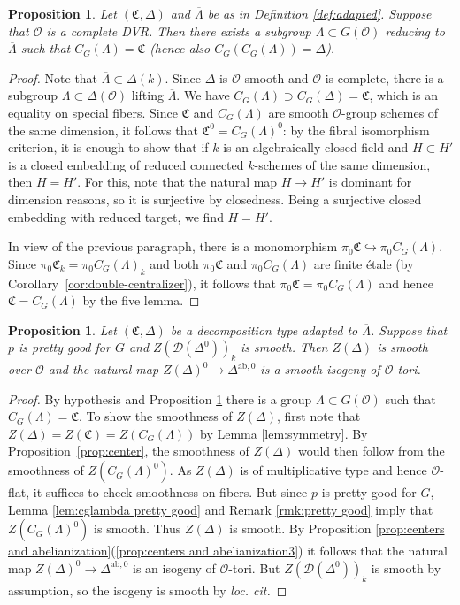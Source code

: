 \documentclass[11pt, letterpaper,english]{amsart}
\theoremstyle{plain}
\newtheorem{prop}[lem]{Proposition}
\theoremstyle{definition}
\numberwithin{equation}{section}
\numberwithin{lem}{section}
\newcommand{\fC}{\mathfrak{C}}
\newcommand{\cO}{\mathcal{O}}
\newcommand{\sD}{{\mathscr D}}
\newcommand{\into}{\hookrightarrow}
\newcommand{\ab}{\textrm{ab}}
\newcommand{\cent}[2]{C_{#1}(#2)}
\newcommand{\Ld}{\Lambda}
\newcommand{\Lbar}{\overline{\Lambda}}
\newcommand{\Dt}{\Delta}
\begin{document}
\begin{prop} \label{prop:adapted complete dvr}
Let $(\fC,\Dt)$ and $\Lbar$ be as in Definition \ref{def:adapted}. Suppose that $\cO$ is a complete DVR. Then there exists a subgroup $\Ld \subset G(\cO)$ reducing to $\overline{\Ld}$ such that
$\cent{G}{\Ld}=\fC$ (hence also $\cent{G}{\cent{G}{\Ld}}=\Dt$). 
\end{prop}

\begin{proof}
Note that $\Lbar \subset \Dt(k)$. Since $\Dt$ is $\cO$-smooth and $\cO$ is complete, there is a subgroup $\Ld \subset \Dt(\cO)$ lifting $\Lbar$. We have $\cent{G}{\Ld} \supset \cent{G}{\Dt} = \fC$, which is an equality on special fibers. Since $\fC$ and $C_G(\Lambda)$ are smooth $\cO$-group schemes of the same dimension, it follows that $\fC^0 = C_G(\Lambda)^0$: by the fibral isomorphism criterion, it is enough to show that if $k$ is an algebraically closed field and $H \subset H'$ is a closed embedding of reduced connected $k$-schemes of the same dimension, then $H = H'$. For this, note that the natural map $H \to H'$ is dominant for dimension reasons, so it is surjective by closedness. Being a surjective closed embedding with reduced target, we find $H = H'$.  

In view of the previous paragraph, there is a monomorphism $\pi_0 \fC \into \pi_0 \cent{G}{\Ld}$. Since $\pi_0 \fC_{k} = \pi_0 \cent{G}{\Ld}_{k}$ and both $\pi_0\fC$ and $\pi_0\cent{G}{\Ld}$ are finite \'{e}tale (by Corollary~\ref{cor:double-centralizer}), it follows that $\pi_0 \fC = \pi_0 \cent{G}{\Ld}$ and hence $\fC = \cent{G}{\Ld}$ by the five lemma.
\end{proof}



\begin{prop} \label{prop:smoothness of delta etc}
Let $(\fC,\Dt)$ be a decomposition type adapted to $\Lbar$. 
Suppose that $p$ is \emph{pretty good} for $G$ and $Z(\sD(\Dt^{0}))_k$ is smooth. 
Then $Z(\Dt)$ is smooth over $\cO$ and the natural map $Z(\Dt)^0 \to \Dt^{\ab,0}$ is a \emph{smooth} isogeny of $\cO$-tori. 
\end{prop}

\begin{proof}
By hypothesis and Proposition \ref{prop:adapted complete dvr} there is a group $\Ld \subset G(\cO)$ such that $\cent{G}{\Ld}=\fC$. 
To show the smoothness of $Z(\Dt)$, first note that $Z(\Dt)= Z(\fC)=Z(\cent{G}{\Ld})$ by Lemma \ref{lem:symmetry}. By Proposition~\ref{prop:center}, the smoothness of $Z(\Dt)$ would then follow from the smoothness of $Z(\cent{G}{\Ld}^0)$.  As $Z(\Dt)$ is of multiplicative type and hence $\cO$-flat, it suffices to check smoothness on fibers.  But since $p$ is pretty good for $G$, Lemma \ref{lem:cglambda pretty good} and Remark \ref{rmk:pretty good} imply that $Z(\cent{G}{\Ld}^0)$ is smooth. Thus $Z(\Dt)$ is smooth.  By Proposition \ref{prop:centers and abelianization}(\ref{prop:centers and abelianization3}) it follows that the natural map $Z(\Dt)^0 \to \Dt^{\ab,0}$ is an isogeny of $\cO$-tori.  But $Z(\sD(\Dt^{0}))_k$ is smooth by assumption, so the isogeny is smooth by \textit{loc. cit.} 
\end{proof}
\end{document}
